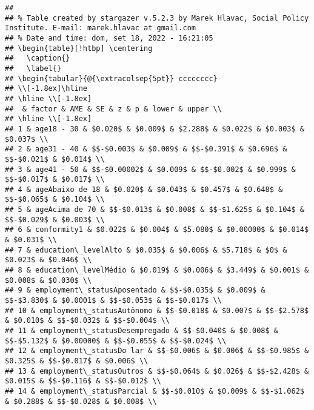 \documentclass[
]{article}
\begin{document}
\begin{verbatim}
## 
## % Table created by stargazer v.5.2.3 by Marek Hlavac, Social Policy Institute. E-mail: marek.hlavac at gmail.com
## % Date and time: dom, set 18, 2022 - 16:21:05
## \begin{table}[!htbp] \centering 
##   \caption{} 
##   \label{} 
## \begin{tabular}{@{\extracolsep{5pt}} cccccccc} 
## \\[-1.8ex]\hline 
## \hline \\[-1.8ex] 
##  & factor & AME & SE & z & p & lower & upper \\ 
## \hline \\[-1.8ex] 
## 1 & age18 - 30 & $0.020$ & $0.009$ & $2.288$ & $0.022$ & $0.003$ & $0.037$ \\ 
## 2 & age31 - 40 & $$-$0.003$ & $0.009$ & $$-$0.391$ & $0.696$ & $$-$0.021$ & $0.014$ \\ 
## 3 & age41 - 50 & $$-$0.00002$ & $0.009$ & $$-$0.002$ & $0.999$ & $$-$0.017$ & $0.017$ \\ 
## 4 & ageAbaixo de 18 & $0.020$ & $0.043$ & $0.457$ & $0.648$ & $$-$0.065$ & $0.104$ \\ 
## 5 & ageAcima de 70 & $$-$0.013$ & $0.008$ & $$-$1.625$ & $0.104$ & $$-$0.029$ & $0.003$ \\ 
## 6 & conformity1 & $0.022$ & $0.004$ & $5.080$ & $0.00000$ & $0.014$ & $0.031$ \\ 
## 7 & education\_levelAlto & $0.035$ & $0.006$ & $5.718$ & $0$ & $0.023$ & $0.046$ \\ 
## 8 & education\_levelMédio & $0.019$ & $0.006$ & $3.449$ & $0.001$ & $0.008$ & $0.030$ \\ 
## 9 & employment\_statusAposentado & $$-$0.035$ & $0.009$ & $$-$3.830$ & $0.0001$ & $$-$0.053$ & $$-$0.017$ \\ 
## 10 & employment\_statusAutônomo & $$-$0.018$ & $0.007$ & $$-$2.578$ & $0.010$ & $$-$0.032$ & $$-$0.004$ \\ 
## 11 & employment\_statusDesempregado & $$-$0.040$ & $0.008$ & $$-$5.132$ & $0.00000$ & $$-$0.055$ & $$-$0.024$ \\ 
## 12 & employment\_statusDo lar & $$-$0.006$ & $0.006$ & $$-$0.985$ & $0.325$ & $$-$0.017$ & $0.006$ \\ 
## 13 & employment\_statusOutros & $$-$0.064$ & $0.026$ & $$-$2.428$ & $0.015$ & $$-$0.116$ & $$-$0.012$ \\ 
## 14 & employment\_statusParcial & $$-$0.010$ & $0.009$ & $$-$1.062$ & $0.288$ & $$-$0.028$ & $0.008$ \\ 

\end{verbatim}
\end{document}
